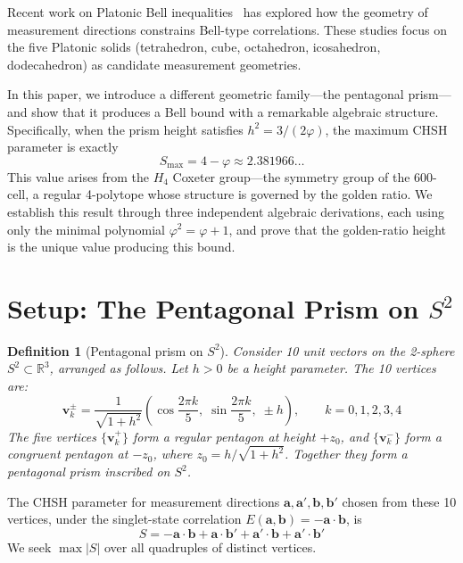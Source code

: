 \documentclass[12pt,a4paper]{article}
\newtheorem{definition}[theorem]{Definition}
\newcommand{\vp}{\varphi}
\newcommand{\R}{\mathbb{R}}
\begin{document}
Recent work on Platonic Bell inequalities~\cite{tavakoli2020} has explored how 
the geometry of measurement directions constrains Bell-type correlations. These 
studies focus on the five Platonic solids (tetrahedron, cube, octahedron, 
icosahedron, dodecahedron) as candidate measurement geometries.

In this paper, we introduce a different geometric family---the pentagonal 
prism---and show that it produces a Bell bound with a remarkable algebraic 
structure. Specifically, when the prism height satisfies 
$h^2 = 3/(2\vp)$, the maximum CHSH parameter is exactly
\begin{equation}
\label{eq:main_result}
\boxed{\;S_{\max} = 4 - \vp \approx 2.381966\ldots\;}
\end{equation}
This value arises from the $H_4$ Coxeter group---the symmetry group of the 
600-cell, a regular 4-polytope whose structure is governed by the golden ratio. 
We establish this result through three independent algebraic derivations, each 
using only the minimal polynomial $\vp^2 = \vp + 1$, and prove that the 
golden-ratio height is the unique value producing this bound.

\section{Setup: The Pentagonal Prism on $S^2$}
\label{sec:setup}

\begin{definition}[Pentagonal prism on $S^2$]
Consider 10 unit vectors on the 2-sphere $S^2 \subset \R^3$, arranged as 
follows. Let $h > 0$ be a height parameter. The 10 vertices are:
\begin{equation}
\label{eq:vertices}
\mathbf{v}_k^{\pm} = \frac{1}{\sqrt{1+h^2}}\left(\cos\frac{2\pi k}{5},\; 
\sin\frac{2\pi k}{5},\; \pm h\right), \qquad k = 0,1,2,3,4
\end{equation}
The five vertices $\{\mathbf{v}_k^+\}$ form a regular pentagon at height $+z_0$, 
and $\{\mathbf{v}_k^-\}$ form a congruent pentagon at $-z_0$, where 
$z_0 = h/\sqrt{1+h^2}$. Together they form a pentagonal prism inscribed 
on $S^2$.
\end{definition}

The CHSH parameter for measurement directions $\mathbf{a}, \mathbf{a}', 
\mathbf{b}, \mathbf{b}'$ chosen from these 10 vertices, under the 
singlet-state correlation $E(\mathbf{a},\mathbf{b}) = -\mathbf{a}\cdot\mathbf{b}$, is
\begin{equation}
S = -\mathbf{a}\cdot\mathbf{b} + \mathbf{a}\cdot\mathbf{b}' 
  + \mathbf{a}'\cdot\mathbf{b} + \mathbf{a}'\cdot\mathbf{b}'
\end{equation}
We seek $\max |S|$ over all quadruples of distinct vertices.
\end{document}
